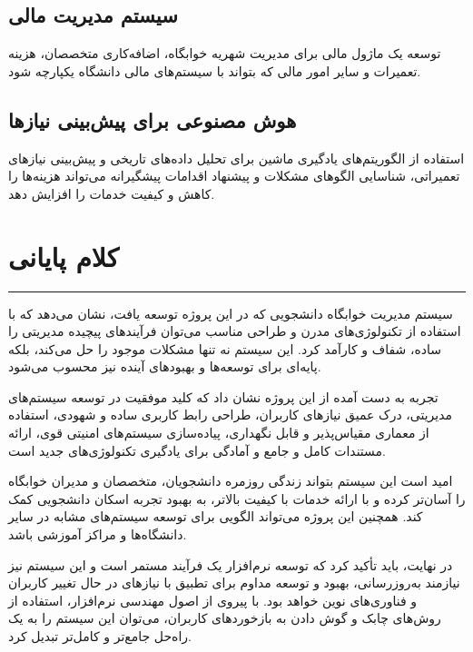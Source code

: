 \documentclass[12pt,a4paper]{report}
\begin{document}
	\subsection{سیستم مدیریت مالی}
	
	توسعه یک ماژول مالی برای مدیریت شهریه خوابگاه، اضافه‌کاری متخصصان، هزینه تعمیرات و سایر امور مالی که بتواند با سیستم‌های مالی دانشگاه یکپارچه شود.
	
	\subsection{هوش مصنوعی برای پیش‌بینی نیازها}
	
	استفاده از الگوریتم‌های یادگیری ماشین برای تحلیل داده‌های تاریخی و پیش‌بینی نیازهای تعمیراتی، شناسایی الگوهای مشکلات و پیشنهاد اقدامات پیشگیرانه می‌تواند هزینه‌ها را کاهش و کیفیت خدمات را افزایش دهد.
	
	\section{کلام پایانی}
	\noindent\rule{\textwidth}{0.4pt}
	
	سیستم مدیریت خوابگاه دانشجویی که در این پروژه توسعه یافت، نشان می‌دهد که با استفاده از تکنولوژی‌های مدرن و طراحی مناسب می‌توان فرآیندهای پیچیده مدیریتی را ساده، شفاف و کارآمد کرد. این سیستم نه تنها مشکلات موجود را حل می‌کند، بلکه پایه‌ای برای توسعه‌ها و بهبودهای آینده نیز محسوب می‌شود.
	
	تجربه به دست آمده از این پروژه نشان داد که کلید موفقیت در توسعه سیستم‌های مدیریتی، درک عمیق نیازهای کاربران، طراحی رابط کاربری ساده و شهودی، استفاده از معماری مقیاس‌پذیر و قابل نگهداری، پیاده‌سازی سیستم‌های امنیتی قوی، ارائه مستندات کامل و جامع و آمادگی برای یادگیری تکنولوژی‌های جدید است.
	
	امید است این سیستم بتواند زندگی روزمره دانشجویان، متخصصان و مدیران خوابگاه را آسان‌تر کرده و با ارائه خدمات با کیفیت بالاتر، به بهبود تجربه اسکان دانشجویی کمک کند. همچنین این پروژه می‌تواند الگویی برای توسعه سیستم‌های مشابه در سایر دانشگاه‌ها و مراکز آموزشی باشد.
	
	در نهایت، باید تأکید کرد که توسعه نرم‌افزار یک فرآیند مستمر است و این سیستم نیز نیازمند به‌روزرسانی، بهبود و توسعه مداوم برای تطبیق با نیازهای در حال تغییر کاربران و فناوری‌های نوین خواهد بود. با پیروی از اصول مهندسی نرم‌افزار، استفاده از روش‌های چابک و گوش دادن به بازخوردهای کاربران، می‌توان این سیستم را به یک راه‌حل جامع‌تر و کامل‌تر تبدیل کرد.
	
\end{document}
